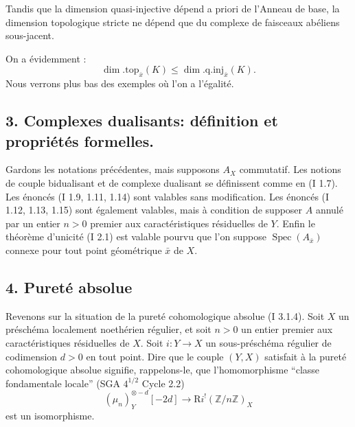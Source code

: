 \documentclass[11pt]{article}
\DeclareMathOperator{\Spec}{Spec}
\newcommand{\R}{\mathrm{R}}\newcommand{\RHomCore}{\mathrm{RHom}}
\newcommand{\Z}{\mathbb{Z}}
\providecommand{\R}{\mathrm R}
\providecommand{\Z}{\mathbb Z}
\providecommand{\Spec}{\operatorname{Spec}}
\providecommand{\Spec}{\operatorname{Spec}}
\providecommand{\Spec}{\operatorname{Spec}}
\providecommand{\Spec}{\operatorname{Spec}}
\begin{document}
Tandis que la dimension quasi-injective dépend a priori de l'Anneau 
de base, la
dimension topologique stricte ne dépend que du complexe de faisceaux abéliens sous-jacent.

On a évidemment :
\[
        \dim.\mathrm{top}_{\bar{x}}(K)\leq \dim.\mathrm{q.inj}_{\bar{x}}(K).
\]
Nous verrons plus bas des exemples où l'on a l'égalité.

\subsection*{3. Complexes dualisants: définition et propriétés formelles.}

Gardons les notations précédentes, mais supposons $A_X$ commutatif. Les notions de couple bidualisant et de complexe dualisant se définissent comme en (I 1.7). Les énoncés (I 1.9, 1.11, 1.14) sont valables sans modification. Les énoncés (I 1.12, 1.13, 1.15) sont également valables, mais à condition de supposer $A$ annulé par un entier $n>0$ premier aux caractéristiques résiduelles de $Y$. Enfin le théorème d'unicité (I 2.1) est valable pourvu que l'on suppose $\Spec(A_{\bar{x}})$ connexe pour tout point géométrique $\bar{x}$ de $X$.

\subsection*{4. Pureté absolue}

Revenons sur la situation de la pureté cohomologique absolue (I 3.1.4). Soit $X$ un préschéma localement noethérien régulier, et soit $n>0$ un entier premier aux caractéristiques résiduelles de $X$. Soit $i:Y\to X$ un sous-préschéma régulier de codimension $d>0$ en tout point. Dire que le couple $(Y,X)$ satisfait à la pureté cohomologique absolue signifie, rappelons-le, que l'homomorphisme ``classe fondamentale locale'' (SGA $4^{1/2}$ Cycle 2.2)
\begin{equation}\tag{4.1}
        (\mu_n)_Y^{\otimes -d}[-2d]\longrightarrow \R i^!(\Z/n\Z)_X
\end{equation}
est un
isomorphisme.
\end{document}
